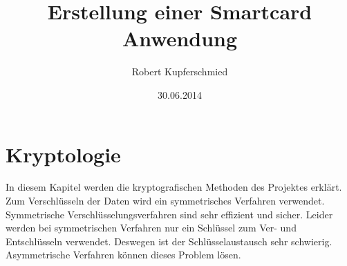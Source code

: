 \documentclass[parskip]{scrartcl}
\begin{document}
\subject{Projektdokumentation im Modul Smartcard}
\title{Erstellung einer Smartcard Anwendung}
\author{Robert Kupferschmied}
\date{30.06.2014}

\maketitle
\onehalfspacing
\section{Kryptologie}
In diesem Kapitel werden die kryptografischen Methoden des Projektes erklärt. Zum Verschlüsseln der Daten wird ein symmetrisches Verfahren verwendet. Symmetrische Verschlüsselungsverfahren sind sehr effizient und sicher. Leider werden bei symmetrischen Verfahren nur ein Schlüssel zum Ver- und Entschlüsseln verwendet. Deswegen ist der Schlüsselaustausch sehr schwierig. Asymmetrische Verfahren können dieses Problem lösen.
\end{document}
